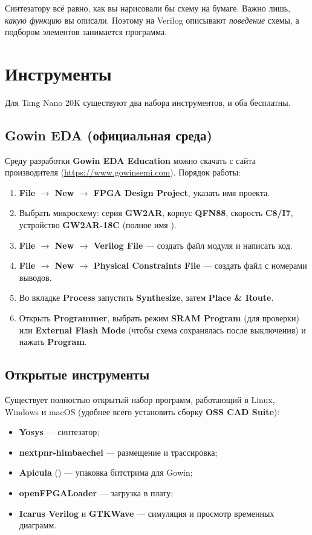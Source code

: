 \begin{ideabox}
Синтезатору всё равно, как вы нарисовали бы схему на бумаге. Важно лишь,
\emph{какую функцию} вы описали. Поэтому на Verilog описывают
\emph{поведение} схемы, а подбором элементов занимается программа.
\end{ideabox}

\section{Инструменты}

Для Tang Nano 20K существуют два набора инструментов, и оба бесплатны.

\subsection{Gowin EDA (официальная среда)}

Среду разработки \textbf{Gowin EDA Education} можно скачать с сайта
производителя (\url{https://www.gowinsemi.com}). Порядок работы:
\begin{enumerate}
  \item \textbf{File $\to$ New $\to$ FPGA Design Project}, указать имя проекта.
  \item Выбрать микросхему: серия \textbf{GW2AR}, корпус \textbf{QFN88},
        скорость \textbf{C8/I7}, устройство \textbf{GW2AR-18C}
        (полное имя ).
  \item \textbf{File $\to$ New $\to$ Verilog File} --- создать файл модуля
        и написать код.
  \item \textbf{File $\to$ New $\to$ Physical Constraints File} --- создать
        файл  с номерами выводов.
  \item Во вкладке \textbf{Process} запустить \textbf{Synthesize}, затем
        \textbf{Place \& Route}.
  \item Открыть \textbf{Programmer}, выбрать режим \textbf{SRAM Program}
        (для проверки) или \textbf{External Flash Mode} (чтобы схема
        сохранялась после выключения) и нажать \textbf{Program}.
\end{enumerate}

\subsection{Открытые инструменты}

Существует полностью открытый набор программ, работающий в Linux, Windows и macOS
(удобнее всего установить сборку \textbf{OSS CAD Suite}):
\begin{itemize}
  \item \textbf{Yosys} --- синтезатор;
  \item \textbf{nextpnr-himbaechel} --- размещение и трассировка;
  \item \textbf{Apicula} () --- упаковка битстрима для Gowin;
  \item \textbf{openFPGALoader} --- загрузка в плату;
  \item \textbf{Icarus Verilog} и \textbf{GTKWave} --- симуляция и
        просмотр временных диаграмм.
\end{itemize}

